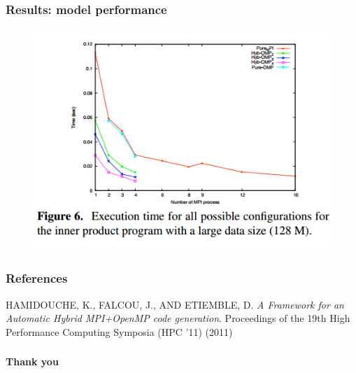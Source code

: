 \documentclass{beamer}
\begin{document}
\begin{frame}
\frametitle{Results: model performance}

\begin{figure}
\includegraphics[width=0.8\linewidth]{results-plots2}
\end{figure}

\end{frame}






\begin{frame}
\frametitle{References}

HAMIDOUCHE, K., FALCOU, J., AND ETIEMBLE, D.
\textit{A Framework for an Automatic Hybrid MPI+OpenMP code generation}. Proceedings of the 19th High Performance Computing Symposia (HPC '11) (2011)

\end{frame}

\begin{frame}
\frametitle{}

\begin{center}
\textbf{Thank you}
\end{center}

\end{frame}
\end{document}
